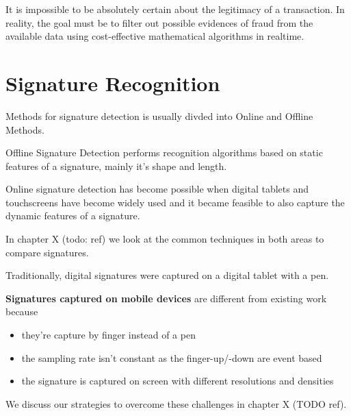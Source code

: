 \documentclass[a4paper, oneside]{csthesis}
\begin{document}
It is impossible to be absolutely certain about the legitimacy of a transaction. In reality, the goal must be to filter out possible evidences of fraud from the available data using cost-effective mathematical algorithms in realtime.







\section{Signature Recognition}

Methods for signature detection is usually divded into Online and Offline Methods.

Offline Signature Detection performs recognition algorithms based on static features of a signature, mainly it's shape and length.

Online signature detection has become possible when digital tablets and touchscreens have become widely used and it became feasible to also capture the dynamic features of a signature.

In chapter X (todo: ref) we look at the common techniques in both areas to compare signatures.

Traditionally, digital signatures were captured on a digital tablet with a pen.

\textbf{Signatures captured on mobile devices} are different from existing work because

\begin{itemize}
    \item they're capture by finger instead of a pen
    \item the sampling rate isn't constant as the finger-up/-down are event based
    \item the signature is captured on screen with different resolutions and densities
\end{itemize}

We discuss our strategies to overcome these challenges in chapter X (TODO ref).

\end{document}
